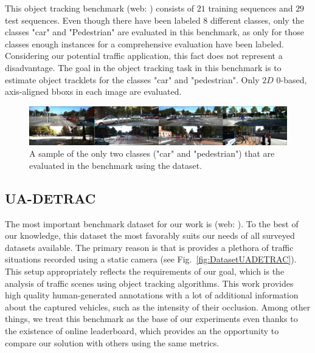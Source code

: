 This object tracking benchmark \cite{Geiger2012CVPR} (web: \cite{kittiobjecttrackingdataset}) consists of $21$ training sequences and $29$ test sequences. Even though there have been labeled $8$ different classes, only the classes "car" and "Pedestrian" are evaluated in this benchmark, as only for those classes enough instances for a comprehensive evaluation have been labeled. Considering our potential traffic application, this fact does not represent a disadvantage. The goal in the object tracking task in this benchmark is to estimate object tracklets for the classes "car" and "pedestrian". Only $2D$ $0$-based, axis-aligned \glspl{bbox} in each image are evaluated.

\begin{figure}[t]
    \centerline{\includegraphics[width=\linewidth]{figures/datasets/kitti_object_tracking_sample.jpg}}
    \caption[ dataset]{A sample of the only two classes ("car" and "pedestrian") that are evaluated in the benchmark using the  dataset. }
    \label{fig:DatasetKITTIObjectTracking}
\end{figure}

\subsection{UA-DETRAC}
\label{ssec:DatasetUADETRAC}

The most important benchmark dataset for our work is  \cite{CVIU_UA-DETRAC} (web: \cite{uadetracdataset}). To the best of our knowledge, this dataset the most favorably suits our needs of all surveyed datasets available. The primary reason is that is provides a plethora of traffic situations recorded using a static camera (see Fig.~\ref{fig:DatasetUADETRAC}). This setup appropriately reflects the requirements of our goal, which is the analysis of traffic scenes using object tracking algorithms. This work provides high quality human-generated annotations with a lot of additional information about the captured vehicles, such as the intensity of their occlusion. Among other things, we treat this benchmark as the base of our experiments even thanks to the existence of online leaderboard, which provides an the opportunity to compare our solution with others using the same metrics.

